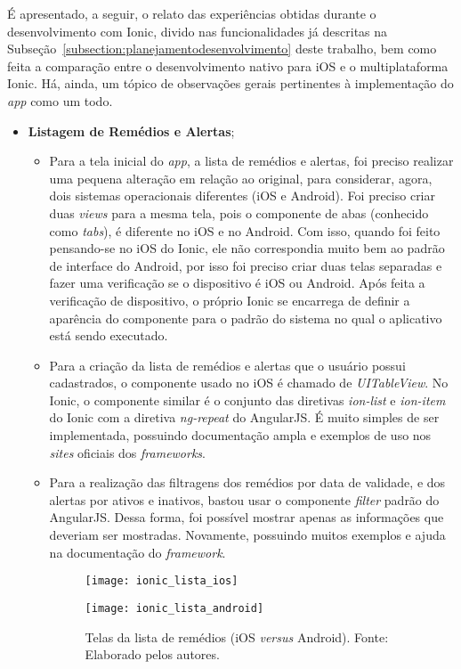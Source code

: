 É apresentado, a seguir, o relato das experiências obtidas durante o desenvolvimento com Ionic, divido nas funcionalidades 
já descritas na Subseção~\ref{subsection:planejamentodesenvolvimento} deste trabalho, bem como feita a comparação entre o desenvolvimento nativo para iOS e 
o multiplataforma Ionic. Há, ainda, um tópico de observações gerais pertinentes à implementação do \textit{app} como um todo. 


 \begin{itemize}
 	
 	\item \textbf{Listagem de Remédios e Alertas};
		\begin{itemize}
			\item Para a tela inicial do \textit{app}, a lista de remédios e alertas, foi preciso realizar uma pequena alteração em relação ao original, para considerar, agora, 
			dois sistemas operacionais diferentes (iOS e Android). Foi preciso criar duas 
			\textit{views} para a mesma tela, pois o componente de abas (conhecido como \textit{tabs}), é diferente no iOS e no Android. Com isso, quando foi feito pensando-se no iOS do Ionic, ele não correspondia 
			muito bem ao padrão de interface do Android, por isso foi preciso criar duas telas separadas e fazer uma verificação se o dispositivo é iOS ou Android. Após feita a verificação de dispositivo, o próprio
			Ionic se encarrega de definir a aparência do componente para o padrão do sistema no qual o aplicativo está sendo executado.

			\item Para a criação da lista de remédios e alertas que o usuário possui cadastrados, o componente usado no iOS é chamado de \textit{UITableView}. No Ionic, o componente similar é o conjunto das diretivas 
			\textit{ion-list} e \textit{ion-item} do Ionic com a diretiva \textit{ng-repeat} do AngularJS. 
			É muito simples de ser implementada, possuindo documentação ampla e exemplos de uso nos \textit{sites} oficiais dos \textit{frameworks}.

			\item Para a realização das filtragens dos remédios por data de validade, e dos alertas por ativos e inativos, bastou usar o componente \textit{filter} padrão do AngularJS. Dessa forma, foi possível 
			mostrar apenas as informações que deveriam ser mostradas. Novamente, possuindo muitos exemplos e ajuda na documentação do \textit{framework}.

			 \begin{figure}[H]
			 	\centering
			 	\begin{minipage}{.5\textwidth}
			 		\centering
			 		\texttt{[image: ionic\_lista\_ios]}
			 	\end{minipage}%
			 	\begin{minipage}{.5\textwidth}
			 		\centering
			 		\texttt{[image: ionic\_lista\_android]}
			 	\end{minipage}
			 	\caption[Telas da lista de remédios (iOS \textit{versus} Android)]{ Telas da lista de remédios (iOS \textit{versus} Android). Fonte: Elaborado pelos autores.}
			 	\label{fig:ionic_lista}
			 \end{figure}


\end{itemize}
\end{itemize}
